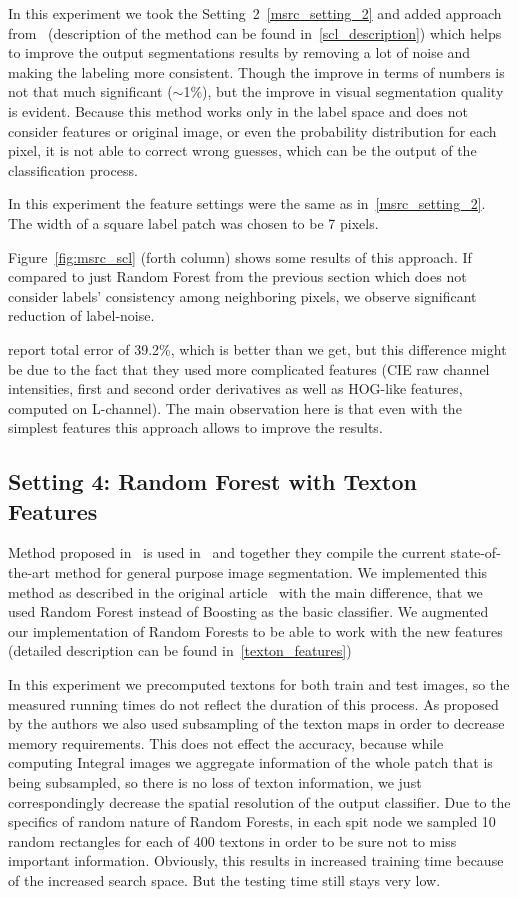 In this experiment we took the Setting~2~\ref{msrc_setting_2} and added approach from~\cite{Kontschieder2011}  (description of the method can be found
in~\ref{scl_description}) which helps to improve the output segmentations results by removing a lot of noise and making the labeling more consistent.
Though the improve in terms of numbers is not that much significant ($\sim$1\%), but the improve in visual segmentation quality is evident.
Because this method works only in the label space and does not consider features or original image, or even the probability distribution for each pixel,
it is not able to correct wrong guesses, which can be the output of the classification process.

In this experiment the feature settings were the same as in~\ref{msrc_setting_2}. The width of a square label patch was chosen to be 7 pixels.

Figure~\ref{fig:msrc_scl} (forth column) shows some results of this approach. If compared to just Random Forest from the previous section which
does not consider labels' consistency among neighboring pixels, we observe significant reduction of label-noise.

\cite{Kontschieder2011} report total error of 39.2\%, which is better than we get, but this difference might be due to the fact that they used more
complicated features (CIE raw channel intensities, first and second order derivatives as well as HOG-like features, computed on L-channel). The 
main observation here is that even with the simplest features this approach allows to improve the results.

\subsection{Setting 4: Random Forest with Texton Features}
\label{msrc_setting_4}
Method proposed in~\cite{Shotton2009} is used in~\cite{Krahenbuhl2011} and together they compile the current state-of-the-art method for general purpose
image segmentation. We implemented this method as described in the original article~\cite{Shotton2009} with the main difference, that we used Random 
Forest instead of Boosting
as the basic classifier. We augmented our implementation of Random Forests to be able to work with the new features (detailed description can be found
in~\ref{texton_features})

In this experiment we precomputed textons for both train and test images, so the measured running times do not reflect the duration of this process.
As proposed by the authors we also used subsampling of the texton maps in order to decrease memory requirements. This does not effect the accuracy,
because while computing Integral images we aggregate information of the whole patch that is being subsampled, so there is no loss of texton information,
we just correspondingly decrease the spatial resolution of the output classifier.
Due to the specifics of random nature of Random Forests, in each spit node we sampled 10 random rectangles for each of 400 textons in order to be sure not to
miss important information. Obviously, this results in increased training time because of the increased search space. But the testing time still stays very
low.

